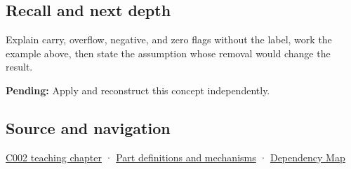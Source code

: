 \subsection{Recall and next depth}\label{appendix-8d687c9c08ab-recall-and-next-depth}

Explain carry, overflow, negative, and zero flags without the label, work the example above, then state the assumption whose removal would change the result.

\textbf{Pending:} Apply and reconstruct this concept independently.

\subsection{Source and navigation}\label{appendix-8d687c9c08ab-source-and-navigation}

\hyperref[01-foundations-i-ch001-arithmetic-becomes-a-policy]{C002 teaching chapter} · \hyperref[appendix-fd090d982a15]{Part definitions and mechanisms} · \hyperref[appendix-4ad47bdd269a]{Dependency Map}
